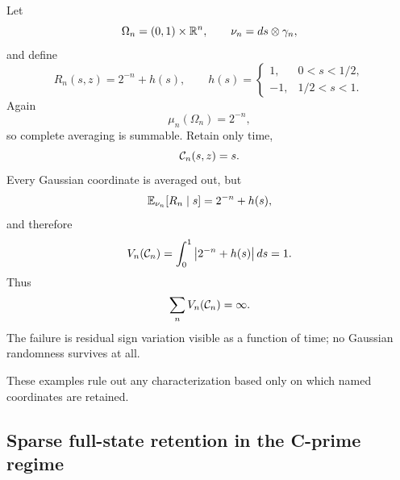 \begin{example}
\label{ex:time-only-fails}
Let
\begin{equation*}
  \Omega_n=(0,1)\times\mathbb R^n,
  \qquad
  \nu_n=ds\otimes\gamma_n,
\end{equation*}
and define
\begin{equation*}
  R_n(s,z)
  =
  2^{-n}+h(s),
  \qquad
  h(s)
  =
  \begin{cases}
    1,&0<s<1/2,\\
    -1,&1/2<s<1.
  \end{cases}
\end{equation*}
Again
\begin{equation*}
  \mu_n(\Omega_n)=2^{-n},
\end{equation*}
so complete averaging is summable. Retain only time,
\begin{equation*}
  \mathcal C_n(s,z)=s.
\end{equation*}
Every Gaussian coordinate is averaged out, but
\begin{equation*}
  \mathbb E_{\nu_n}[R_n\mid s]
  =
  2^{-n}+h(s),
\end{equation*}
and therefore
\begin{equation}
  V_n(\mathcal C_n)
  =
  \int_0^1\left|2^{-n}+h(s)\right|ds
  =1.
  \label{eq:time-only-TV}
\end{equation}
Thus
\begin{equation*}
  \sum_nV_n(\mathcal C_n)=\infty.
\end{equation*}
The failure is residual sign variation visible as a function of time; no Gaussian randomness survives at all.
\end{example}

These examples rule out any characterization based only on which named coordinates are retained.

\subsection{Sparse full-state retention in the C-prime regime}

